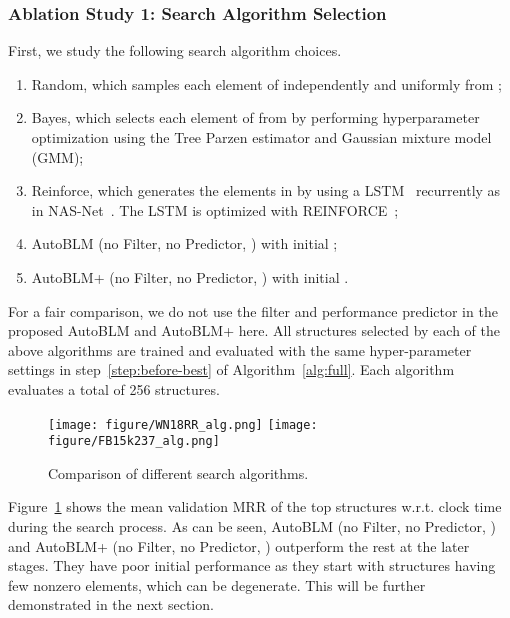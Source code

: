 \documentclass[10pt,journal,compsoc]{IEEEtran}
\begin{document}
\subsubsection{Ablation Study 1: Search Algorithm Selection}
\label{exp:alg:compare}

First,
we 
study the following 
search algorithm
choices.
\begin{enumerate}[label=(\roman*)]
\item Random, which
samples each element 
of  
	independently and uniformly 
	from ;
	
\item {Bayes}, which 
	selects each element of  
	from 
	by
performing hyperparameter optimization using the Tree
	Parzen estimator \cite{bergstra2011algorithms} and Gaussian mixture model
	(GMM);
	
	\item Reinforce,
	which
	generates the  elements in 
	by using a LSTM~\cite{hochreiter1997long} 
	recurrently 
	as in NAS-Net~\cite{zoph2017neural}.
	The LSTM is optimized with REINFORCE~\cite{williams1992simple};
	
	\item AutoBLM (no Filter, no Predictor, ) with initial ;
	
	\item AutoBLM+ (no Filter, no Predictor, ) with initial .
\end{enumerate}

For a fair comparison, we do not use the filter and performance
predictor
in the proposed 
	AutoBLM and
	AutoBLM+ here.
All structures selected by each of the above algorithms are trained and evaluated
with the same hyper-parameter settings in step~\ref{step:before-best} of Algorithm~\ref{alg:full}.
Each algorithm evaluates 
a total
of 256 structures.

\begin{figure}[ht]
	\vspace{-3px}
	\centering
	\texttt{[image: figure/WN18RR\_alg.png]}\hfill
\texttt{[image: figure/FB15k237\_alg.png]}
	\vspace{-10px}
	\caption{Comparison of different search algorithms.}
	\label{fig:automl}
	\vspace{-4px}
\end{figure}

Figure~\ref{fig:automl}
shows the mean 
validation MRR of the top 
 structures
w.r.t. clock time during the search process.
As can be seen,
AutoBLM (no Filter, no Predictor, ) and 
AutoBLM+ (no Filter, no Predictor, ) outperform the rest at the later stages.
They have
poor initial performance as they start with structures having few nonzero elements,
which can be degenerate.
This will be further demonstrated in the next section.
\end{document}
